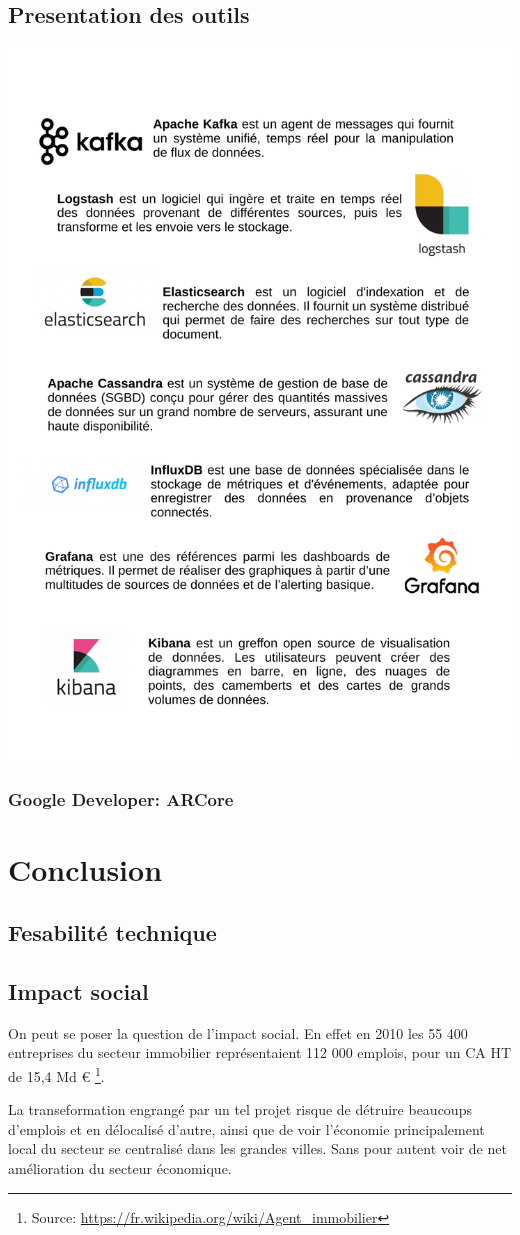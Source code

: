 \documentclass[12pt]{report}
\begin{document}
\section{Presentation des outils}
\includegraphics[width=16cm]{pdfinc/Outils.pdf}
\subsection{Google Developer: ARCore}


\chapter{Conclusion}
\section{Fesabilité technique}

\section{Impact social}
On peut se poser la question de l'impact social.
En effet en 2010 les 55 400 entreprises du secteur immobilier représentaient
112 000 emplois, pour un CA HT de 15,4 Md \euro{}
\footnote{Source: \url{https://fr.wikipedia.org/wiki/Agent_immobilier}}.

La transeformation engrangé par un tel projet risque de détruire beaucoups
d'emplois et en délocalisé d'autre, ainsi que de voir l'économie principalement
local du secteur se centralisé dans les grandes villes. Sans pour autent voir de
net amélioration du secteur économique. 
\end{document}
